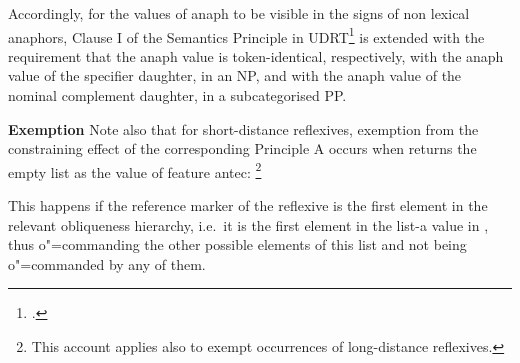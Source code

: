 \documentclass[output=paper
,modfonts
,nonflat]{langsci/langscibook}
\begin{document}
Accordingly, for the values of {\sc anaph} to be
visible in the signs of non lexical anaphors, 
Clause I of the Semantics Principle in UDRT\footnote{
\citep[]{frank:sem95}.}
is extended with the
requirement that the {\sc anaph} value is token-identical,
respectively, with
the {\sc anaph} value of the specifier daughter, in an NP, and 
with the {\sc anaph} value of the nominal complement daughter, in 
a subcategorised PP.


\textbf{Exemption} Note also that for short-distance reflexives, exemption from the constraining effect
of the corresponding Principle A occurs when
returns the empty list as the value of feature {\sc antec}:%
%
\footnote{
This account applies also to exempt occurrences of 
long-distance reflexives.}
%

\begin{exe}

\ex
{}
\avmfont{\sc}
\avmvalfont{\it}
\begin{avm}
\end{avm}
\end{exe}

This happens 
if the reference marker of the reflexive 
is the first element in the relevant
obliqueness hierarchy, i.e.\ it is the first element 
in the {\sc list-a} value in ,
thus \mbox{o"=commanding} the other possible elements of this list and not being
\mbox{o"=commanded} by any of them. 
\end{document}

